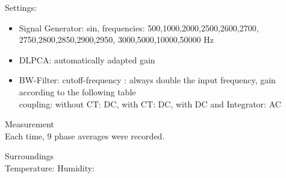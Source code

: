{\large Settings:} \newline
\begin{itemize}
\item Signal Generator:  sin,
frequencies: 500,1000,2000,2500,2600,2700,
2750,2800,2850,2900,2950, 3000,5000,10000,50000 Hz\\
\item DLPCA:  automatically adapted gain
\item BW-Filter:  cutoff-frequency : always double the input frequency, gain according to the following table\\ coupling: without CT: DC, with CT: DC, with DC and Integrator: AC
\end{itemize}
{\large Measurement} \\
Each time, 9 phase averages were recorded. 

\large{Surroundings} \\
Temperature:  
Humidity: 